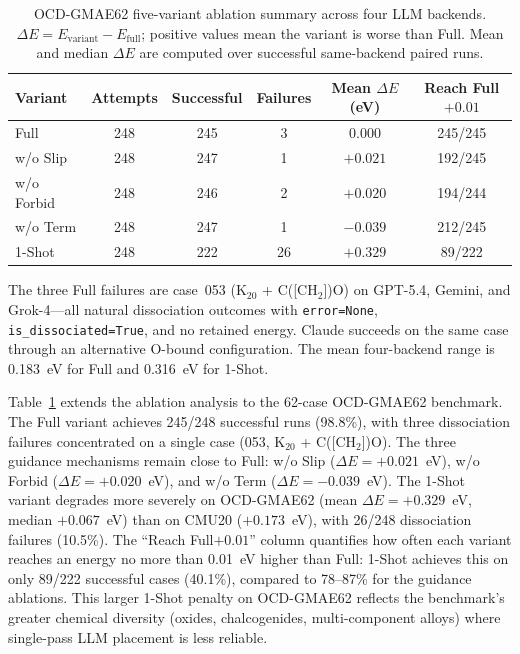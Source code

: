 \documentclass[%
 preprint,
 superscriptaddress,
 amsmath,amssymb,
 aps,
 prb,
 floatfix,
]{revtex4-2}
\begin{document}
\begin{table}[ht]
\centering
\caption{OCD-GMAE62 five-variant ablation summary across four LLM backends. $\Delta E = E_{\mathrm{variant}} - E_{\mathrm{full}}$; positive values mean the variant is worse than Full. Mean and median $\Delta E$ are computed over successful same-backend paired runs.}
\label{tab:si-ocd62-ablation-summary}
\begin{tabular}{lccccc}
\toprule
Variant & Attempts & Successful & Failures & Mean $\Delta E$ (eV) & Reach Full$+0.01$ \\
\midrule
Full & 248 & 245 & 3 & 0.000 & 245/245 \\
w/o Slip & 248 & 247 & 1 & $+0.021$ & 192/245 \\
w/o Forbid & 248 & 246 & 2 & $+0.020$ & 194/244 \\
w/o Term & 248 & 247 & 1 & $-0.039$ & 212/245 \\
1-Shot & 248 & 222 & 26 & $+0.329$ & 89/222 \\
\bottomrule
\end{tabular}
\end{table}

The three Full failures are case~053 (K$_{20}$ + C([CH$_2$])O) on GPT-5.4, Gemini, and Grok-4---all natural dissociation outcomes with \texttt{error=None}, \texttt{is\_dissociated=True}, and no retained energy. Claude succeeds on the same case through an alternative O-bound configuration. The mean four-backend range is 0.183~eV for Full and 0.316~eV for 1-Shot.

Table~\ref{tab:si-ocd62-ablation-summary} extends the ablation analysis to the 62-case OCD-GMAE62 benchmark. The Full variant achieves 245/248 successful runs (98.8\%), with three dissociation failures concentrated on a single case (053, K$_{20}$ + C([CH$_2$])O). The three guidance mechanisms remain close to Full: w/o Slip ($\Delta E = +0.021$~eV), w/o Forbid ($\Delta E = +0.020$~eV), and w/o Term ($\Delta E = -0.039$~eV). The 1-Shot variant degrades more severely on OCD-GMAE62 (mean $\Delta E = +0.329$~eV, median $+0.067$~eV) than on CMU20 ($+0.173$~eV), with 26/248 dissociation failures (10.5\%). The ``Reach Full$+0.01$'' column quantifies how often each variant reaches an energy no more than 0.01~eV higher than Full: 1-Shot achieves this on only 89/222 successful cases (40.1\%), compared to 78--87\% for the guidance ablations. This larger 1-Shot penalty on OCD-GMAE62 reflects the benchmark's greater chemical diversity (oxides, chalcogenides, multi-component alloys) where single-pass LLM placement is less reliable.
\end{document}
